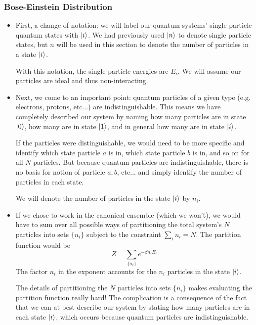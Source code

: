 \documentclass[11pt, a4paper]{article}
\begin{document}
\subsubsection{Bose-Einstein Distribution}
\begin{itemize}
	\item First, a change of notation: we will label our quantum systems' single particle quantum states with $ \ket{i} $. We had previously used $ \ket{n} $ to denote single particle states, but $ n $ will be used in this section to denote the number of particles in a state $ \ket{i} $.
	
	With this notation, the single particle energies are $ E_{i} $. We will assume our particles are ideal and thus non-interacting. 
	
	\item Next, we come to an important point: quantum particles of a given type (e.g. electrons, protons, etc...) are indistinguishable. This means we have completely described our system by naming how many particles are in state $ \ket{0} $, how many are in state $ \ket{1} $, and in general how many are in state $ \ket{i} $. 
	
	If the particles were distinguishable, we would need to be more specific and identify which state particle $ a $ is in, which state particle $ b $ is in, and so on for all $ N $ particles. But because quantum particles are indistinguishable, there is no basis for notion of particle $ a, b $, etc... and simply identify the number of particles in each state. 
	
	We will denote the number of particles in the state $ \ket{i} $  by $ n_{i} $. 
	
	\item If we chose to work in the canonical ensemble (which we won't), we would have to sum over all possible ways of partitioning the total system's $ N $ particles into sets $ \{n_{i}\} $ subject to the constraint $ \sum_{i}n_{i} = N $. The partition function would be
	\begin{equation*}
		Z = \sum_{\{n_{i}\}} e^{-\beta n_{i}E_{i}}
	\end{equation*}
	The factor $ n_{i} $ in the exponent accounts for the $ n_{i} $ particles in the state $ \ket{i} $. 
	
	The details of partitioning the $ N $ particles into sets $ \{n_{i}\} $ makes evaluating the partition function really hard! The complication is a consequence of the fact that we can at best describe our system by stating how many particles are in each state $ \ket{i} $, which occurs because quantum particles are indistinguishable.
	

\end{itemize}
\end{document}
